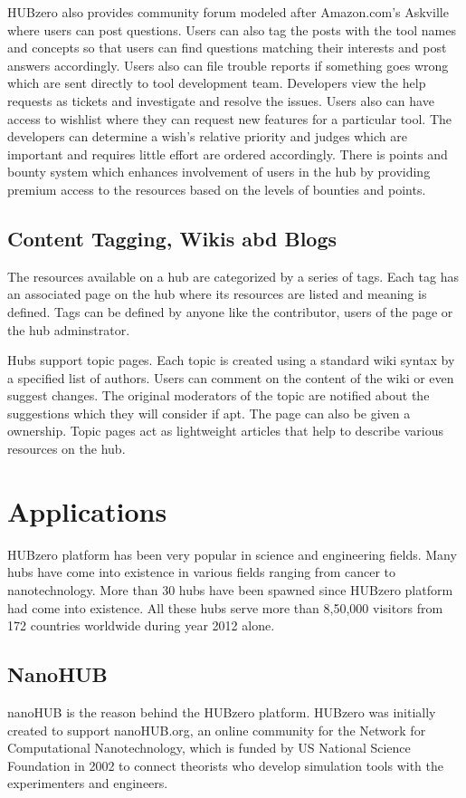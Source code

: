 \documentclass[9pt,twocolumn,twoside]{../../styles/osajnl}
\begin{document}
HUBzero also provides community forum modeled after Amazon.com's
Askville where users can post questions. Users can also tag the posts
with the tool names and concepts so that users can find questions
matching their interests and post answers accordingly. Users also can
file trouble reports if something goes wrong which are sent directly
to tool development team. Developers view the help requests as tickets
and investigate and resolve the issues. Users also can have access to
wishlist where they can request new features for a particular
tool. The developers can determine a wish's relative priority and
judges which are important and requires little effort are ordered
accordingly. There is points and bounty system which enhances
involvement of users in the hub by providing premium access to the
resources based on the levels of bounties and points.

\subsection{Content Tagging, Wikis abd Blogs}
The resources available on a hub are categorized by a series of
tags. Each tag has an associated page on the hub where its resources
are listed and meaning is defined. Tags can be defined by anyone like
the contributor, users of the page or the hub adminstrator.

Hubs support topic pages. Each topic is created using a standard wiki
syntax by a specified list of authors. Users can comment on the
content of the wiki or even suggest changes. The original moderators
of the topic are notified about the suggestions which they will
consider if apt. The page can also be given a ownership. Topic pages
act as lightweight articles that help to describe various resources on
the hub\cite{hubzerofeatures}.

\section{Applications}
HUBzero platform has been very popular in science and engineering
fields. Many hubs have come into existence in various fields ranging
from cancer to nanotechnology. More than 30 hubs have been spawned
since HUBzero platform had come into existence. All these hubs serve
more than 8,50,000 visitors from 172 countries worldwide during year
2012 alone.

\subsection{NanoHUB}
nanoHUB is the reason behind the HUBzero platform. HUBzero was
initially created to support nanoHUB.org, an online community for the
Network for Computational Nanotechnology, which is funded by US
National Science Foundation in 2002 to connect theorists who develop
simulation tools with the experimenters and engineers.
\end{document}
